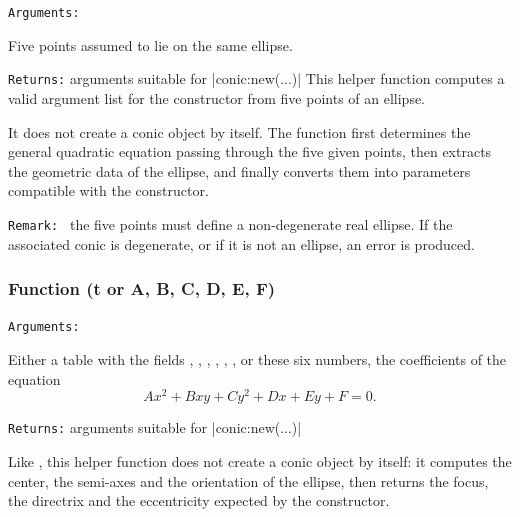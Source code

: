 \texttt{Arguments: }

Five points assumed to lie on the same ellipse.


\medskip
\texttt{Returns:} arguments suitable for  |conic:new(...)|
This helper function computes a valid argument list for the constructor
 from five points of an ellipse.

It does not create a conic object by itself. The function first determines
the general quadratic equation passing through the five given points, then
extracts the geometric data of the ellipse, and finally converts them into
parameters compatible with the constructor.


\medskip

\texttt{Remark: } the five points must define a non-degenerate real ellipse.
If the associated conic is degenerate, or if it is not an ellipse, an error is produced.

\begin{tkzexample}[latex= .4\textwidth]
\begin{center}
\end{center}
\end{tkzexample}


\subsubsection{Function (t or A, B, C, D, E, F)}
\label{ssub:function_el_from_equation}

\texttt{Arguments: }

Either a table  with the fields , , , ,
, , or these six numbers, the coefficients of the equation
\[ Ax^2 + Bxy + Cy^2 + Dx + Ey + F = 0. \]

\medskip
\texttt{Returns:} arguments suitable for |conic:new(...)|

Like , this helper function does not create
a conic object by itself: it computes the center, the semi-axes and the
orientation of the ellipse, then returns the focus, the directrix and the
eccentricity expected by the constructor.

